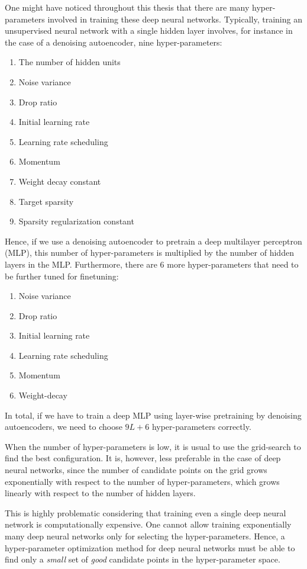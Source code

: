 \documentclass[dissertation,nocontribution]{aaltoseries}
\begin{document}
One might have noticed throughout this thesis that there are
many hyper-parameters involved in training these deep
neural networks. Typically, training an unsupervised neural
network with a single hidden layer involves, for instance
in the case of a denoising autoencoder, nine
hyper-parameters:
\begin{enumerate}
    \itemsep 0em
    \item The number of hidden units
    \item Noise variance
    \item Drop ratio
    \item Initial learning rate
    \item Learning rate scheduling
    \item Momentum
    \item Weight decay constant
    \item Target sparsity
    \item Sparsity regularization constant
\end{enumerate}
Hence, if we use a denoising autoencoder to pretrain a deep
multilayer perceptron (MLP), this number of 
hyper-parameters is multiplied by the number of hidden layers
in the MLP. Furthermore, there are 6 more hyper-parameters
that need to be further tuned for finetuning: 
\begin{enumerate}
    \itemsep 0em
    \item Noise variance
    \item Drop ratio
    \item Initial learning rate
    \item Learning rate scheduling
    \item Momentum
    \item Weight-decay
\end{enumerate}
In total, if we have to train a deep MLP using layer-wise
pretraining by denoising autoencoders, we need to choose $9L
+ 6$ hyper-parameters correctly. 

When the number of hyper-parameters is low, it is usual to
use the grid-search to find the best configuration. It is, however,
less preferable in the case of deep neural networks, since
the number of candidate points on the grid grows
exponentially with respect to the number of
hyper-parameters,
which grows linearly with respect to the number of hidden
layers. 

This is highly problematic considering that training even a
single deep neural network is computationally expensive. One
cannot allow training exponentially many deep neural
networks only for selecting the hyper-parameters.
Hence, a hyper-parameter optimization method for deep neural
networks must be able to find only a \textit{small} set of
\textit{good} candidate points in the hyper-parameter space.
\end{document}
